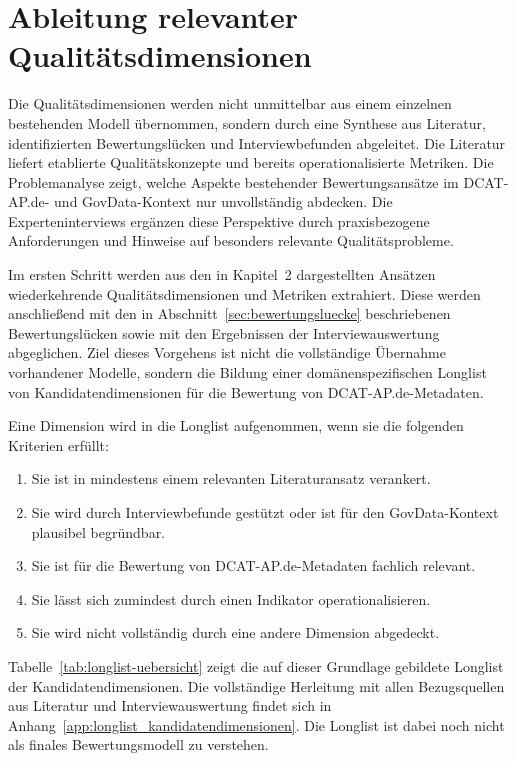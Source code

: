\section{Ableitung relevanter Qualitätsdimensionen}
\label{sec:ableitung_dimensionen}

Die Qualitätsdimensionen werden nicht unmittelbar aus einem einzelnen bestehenden Modell übernommen, sondern durch eine Synthese aus Literatur, identifizierten Bewertungslücken und Interviewbefunden abgeleitet. Die Literatur liefert etablierte Qualitätskonzepte und bereits operationalisierte Metriken. Die Problemanalyse zeigt, welche Aspekte bestehender Bewertungsansätze im DCAT-AP.de- und GovData-Kontext nur unvollständig abdecken. Die Experteninterviews ergänzen diese Perspektive durch praxisbezogene Anforderungen und Hinweise auf besonders relevante Qualitätsprobleme.

Im ersten Schritt werden aus den in Kapitel~2 dargestellten Ansätzen wiederkehrende Qualitätsdimensionen und Metriken extrahiert. Diese werden anschließend mit den in Abschnitt~\ref{sec:bewertungsluecke} beschriebenen Bewertungslücken sowie mit den Ergebnissen der Interviewauswertung abgeglichen. Ziel dieses Vorgehens ist nicht die vollständige Übernahme vorhandener Modelle, sondern die Bildung einer domänenspezifischen Longlist von Kandidatendimensionen für die Bewertung von DCAT-AP.de-Metadaten.

Eine Dimension wird in die Longlist aufgenommen, wenn sie die folgenden Kriterien erfüllt:

\begin{enumerate}
    \item Sie ist in mindestens einem relevanten Literaturansatz verankert.
    \item Sie wird durch Interviewbefunde gestützt oder ist für den GovData-Kontext plausibel begründbar.
    \item Sie ist für die Bewertung von DCAT-AP.de-Metadaten fachlich relevant.
    \item Sie lässt sich zumindest durch einen Indikator operationalisieren.
    \item Sie wird nicht vollständig durch eine andere Dimension abgedeckt.
\end{enumerate}

Tabelle~\ref{tab:longlist-uebersicht} zeigt die auf dieser Grundlage gebildete Longlist der Kandidatendimensionen. Die vollständige Herleitung mit allen Bezugsquellen aus Literatur und Interviewauswertung findet sich in Anhang~\ref{app:longlist_kandidatendimensionen}. Die Longlist ist dabei noch nicht als finales Bewertungsmodell zu verstehen.

